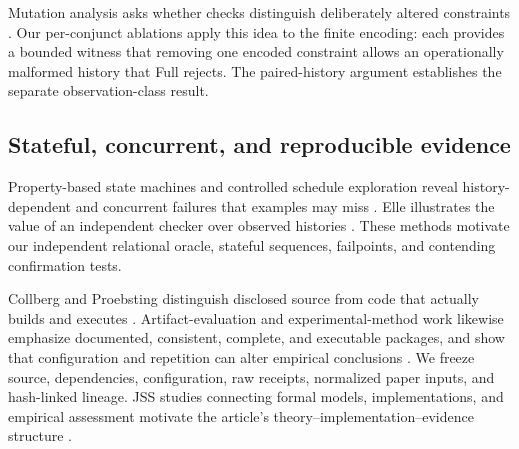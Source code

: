 Mutation analysis asks whether checks distinguish deliberately altered constraints \citep{sullivan2017alloymutation,jia2011mutation,just2014mutants}. Our per-conjunct ablations apply this idea to the finite encoding: each provides a bounded witness that removing one encoded constraint allows an operationally malformed history that Full rejects. The paired-history argument establishes the separate observation-class result.

\subsection{Stateful, concurrent, and reproducible evidence}

Property-based state machines and controlled schedule exploration reveal history-dependent and concurrent failures that examples may miss \citep{claessen2000quickcheck,claessen2009pulse,musuvathi2008chess}. Elle illustrates the value of an independent checker over observed histories \citep{kingsbury2020elle}. These methods motivate our independent relational oracle, stateful sequences, failpoints, and contending confirmation tests.

Collberg and Proebsting distinguish disclosed source from code that actually builds and executes \citep{collberg2016repeatability}. Artifact-evaluation and experimental-method work likewise emphasize documented, consistent, complete, and executable packages, and show that configuration and repetition can alter empirical conclusions \citep{hermann2020artifacts,klees2018fuzz,kessel2024openscience,liu2024artifacts}. We freeze source, dependencies, configuration, raw receipts, normalized paper inputs, and hash-linked lineage. JSS studies connecting formal models, implementations, and empirical assessment motivate the article's theory--implementation--evidence structure \citep{stachtiari2018correctness,alam2021dbverify,song2023continuous,coppa2024concolic}.
